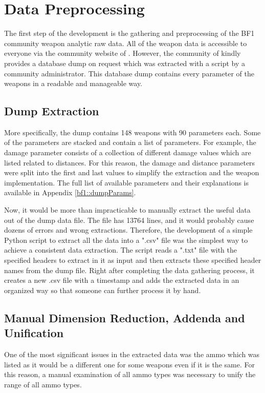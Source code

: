 \documentclass[MGS,Master,english]{twbook}%
\begin{document}
\section{Data Preprocessing} \label{dev::dataPreprocessing}
The first step of the development is the gathering and preprocessing of the \ac{BF1} community weapon analytic raw data. All of the weapon data is accessible to everyone via the community website of \citep{symthic::bf1stats}. However, the community of  kindly provides a database dump on request which was extracted with a script by a community administrator. This database dump contains every parameter of the weapons in a readable and manageable way.

\subsection{Dump Extraction} \label{chapter::dumpExtraction}
More specifically, the dump contains 148 weapons with 90 parameters each. Some of the parameters are stacked and contain a list of parameters. For example, the damage parameter consists of a collection of different damage values which are listed related to distances. For this reason, the damage and distance parameters were split into the first and last values to simplify the extraction and the weapon implementation. The full list of available parameters and their explanations is available in Appendix \ref{bf1::dumpParams}.

Now, it would be more than impracticable to manually extract the useful data out of the dump data file. The file has 13764 lines, and it would probably cause dozens of errors and wrong extractions. Therefore, the development of a simple Python script to extract all the data into a ".csv" file was the simplest way to achieve a consistent data extraction. The script reads a ".txt" file with the specified headers to extract in it as input and then extracts these specified header names from the dump file. Right after completing the data gathering process, it creates a new .csv file with a timestamp and adds the extracted data in an organized way so that someone can further process it by hand.

\subsection{Manual Dimension Reduction, Addenda and Unification}
One of the most significant issues in the extracted data was the ammo which was listed as it would be a different one for some weapons even if it is the same. For this reason, a manual examination of all ammo types was necessary to unify the range of all ammo types. 
\end{document}
